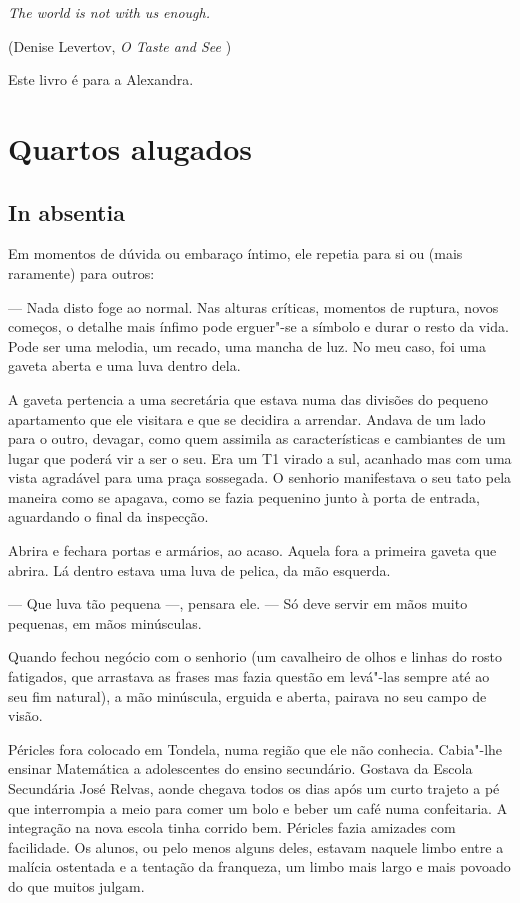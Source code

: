 \emph{The world is not with us enough.}

(Denise Levertov, \emph{O Taste and See })

Este livro é para a Alexandra.


\part{Quartos alugados}

\chapter{In absentia}

Em momentos de dúvida ou embaraço íntimo, ele repetia para si ou (mais
raramente) para outros:

  --- Nada disto foge ao normal. Nas alturas críticas, momentos de
  ruptura, novos começos, o detalhe mais ínfimo pode erguer"-se a símbolo
  e durar o resto da vida. Pode ser uma melodia, um recado, uma mancha
  de luz. No meu caso, foi uma gaveta aberta e uma luva dentro dela.


A gaveta pertencia a uma secretária que estava numa das divisões do
pequeno apartamento que ele visitara e que se decidira a arrendar.
Andava de um lado para o outro, devagar, como quem assimila as
características e cambiantes de um lugar que poderá vir a ser o seu. Era
um T1 virado a sul, acanhado mas com uma vista agradável para uma praça
sossegada. O senhorio manifestava o seu tato pela maneira como se
apagava, como se fazia pequenino junto à porta de entrada, aguardando o
final da inspecção.

Abrira e fechara portas e armários, ao acaso. Aquela fora a primeira
gaveta que abrira. Lá dentro estava uma luva de pelica, da mão esquerda.

--- Que luva tão pequena ---, pensara ele. --- Só deve servir em mãos muito pequenas, em mãos minúsculas.

Quando fechou negócio com o senhorio (um cavalheiro de olhos e linhas do
rosto fatigados, que arrastava as frases mas fazia questão em levá"-las
sempre até ao seu fim natural), a mão minúscula, erguida e aberta,
pairava no seu campo de visão.

Péricles fora colocado em Tondela, numa região que ele não conhecia.
Cabia"-lhe ensinar Matemática a adolescentes do ensino secundário.
Gostava da Escola Secundária José Relvas, aonde chegava todos os dias
após um curto trajeto a pé que interrompia a meio para comer um bolo e
beber um café numa confeitaria. A integração na nova escola tinha
corrido bem. Péricles fazia amizades com facilidade. Os alunos, ou pelo
menos alguns deles, estavam naquele limbo entre a malícia ostentada e
a tentação da franqueza, um limbo mais largo e mais povoado do que
muitos julgam.

